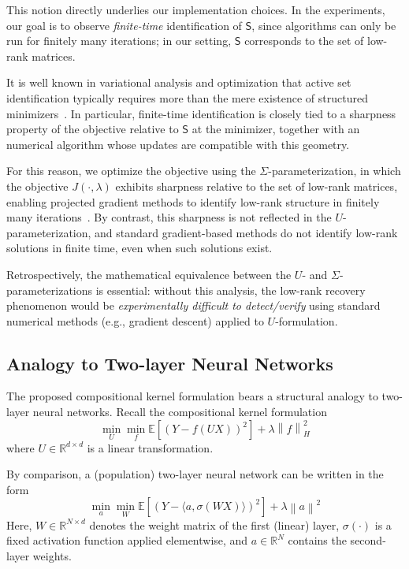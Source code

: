 \documentclass[sn-mathphys-num]{sn-jnl}%
\numberwithin{equation}{section}
\newcommand{\R}{\mathbb{R}}
\newcommand{\E}{\mathbb{E}}
\newcommand{\norm}[1]{\left\|{#1}\right\|} %
\theoremstyle{thmstyleone}%
\theoremstyle{thmstyletwo}%
\theoremstyle{thmstylethree}%
\begin{document}
This notion directly underlies our implementation choices. In the experiments, our goal is to observe \emph{finite-time} identification of $\mathsf{S}$, since algorithms can only be run for finitely many iterations; in our setting, $\mathsf{S}$ corresponds to the set of low-rank matrices.

It is well known in variational analysis and optimization that active set identification typically requires more than the mere existence of structured minimizers~\cite{Bertsekas03, BurkeMo88, Burke90, AlKy91}. In particular, finite-time identification is closely tied to a sharpness property of the objective relative to $\mathsf{S}$ at the minimizer, together with an numerical algorithm whose updates are compatible with this geometry. %

For this reason, we optimize the objective using the $\Sigma$-parameterization, in which the objective $J(\cdot, \lambda)$ exhibits sharpness relative to the set of low-rank matrices, enabling projected gradient methods to identify low-rank structure in finitely many iterations~\cite{Wright93}. By contrast, this sharpness is not reflected in the $U$-parameterization, and standard gradient-based methods do not identify low-rank solutions in finite time, even when such solutions exist. %


Retrospectively, the mathematical equivalence between the $U$- and $\Sigma$-parameterizations is essential: without this analysis, the low-rank recovery phenomenon would be \emph{experimentally difficult to detect/verify} using standard numerical methods (e.g., gradient descent) applied to $U$-formulation.

\subsection{Analogy to Two-layer Neural Networks} 
\label{sec:analogy-to-two-layer-NN}
\indent\indent
The proposed compositional kernel formulation bears a structural analogy to two-layer neural networks. Recall 
the compositional kernel formulation
\begin{equation*}
	\min_U \min_f \E[(Y - f(UX))^2] + \lambda \norm{f}_H^2
\end{equation*}
where $U \in \R^{d \times d}$ is a linear transformation. 

By comparison, a (population) two-layer neural network can be written in the form
\begin{equation*}
	\min_a \min_W \E[(Y - \langle a, \sigma(WX) \rangle)^2] + \lambda \norm{a}^2
\end{equation*} 
Here, $W \in \mathbb{R}^{N \times d}$ denotes the weight matrix of the first (linear) layer, $\sigma(\cdot)$ is a fixed activation function applied elementwise, and $a \in \mathbb{R}^N$ contains the second-layer weights. 
\end{document}
